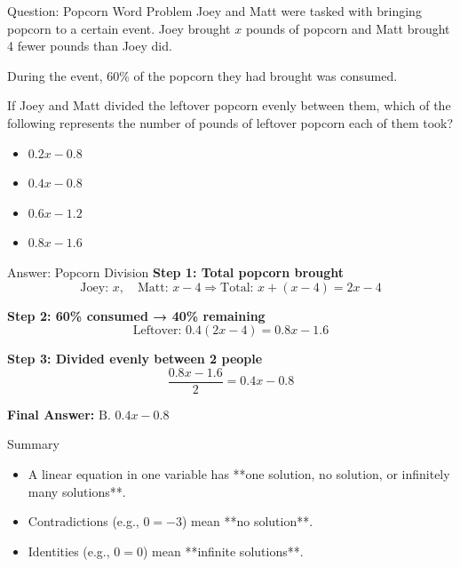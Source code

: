 \documentclass{beamer}
\begin{document}
\begin{frame}{Question: Popcorn Word Problem}
Joey and Matt were tasked with bringing popcorn to a certain event. Joey brought \(x\) pounds of popcorn and Matt brought 4 fewer pounds than Joey did.

During the event, 60\% of the popcorn they had brought was consumed.

If Joey and Matt divided the leftover popcorn evenly between them, which of the following represents the number of pounds of leftover popcorn each of them took?

\vspace{1em}

\begin{itemize}
    \item[\textbf{A.}] \(0.2x - 0.8\)
    \item[\textbf{B.}] \(0.4x - 0.8\)
    \item[\textbf{C.}] \(0.6x - 1.2\)
    \item[\textbf{D.}] \(0.8x - 1.6\)
\end{itemize}
\end{frame}



\begin{frame}{Answer: Popcorn Division}
\textbf{Step 1: Total popcorn brought}
\[
\text{Joey: } x, \quad \text{Matt: } x - 4 \Rightarrow \text{Total: } x + (x - 4) = 2x - 4
\]

\textbf{Step 2: 60\% consumed → 40\% remaining}
\[
\text{Leftover: } 0.4(2x - 4) = 0.8x - 1.6
\]

\textbf{Step 3: Divided evenly between 2 people}
\[
\frac{0.8x - 1.6}{2} = 0.4x - 0.8
\]

\textbf{Final Answer:} \(\boxed{\text{B. } 0.4x - 0.8}\)
\end{frame}






\begin{frame}{Summary}
    \begin{itemize}
        \item A linear equation in one variable has **one solution, no solution, or infinitely many solutions**.
        \item Contradictions (e.g., \( 0 = -3 \)) mean **no solution**.
        \item Identities (e.g., \( 0 = 0 \)) mean **infinite solutions**.
    \end{itemize}
\end{frame}
\end{document}
